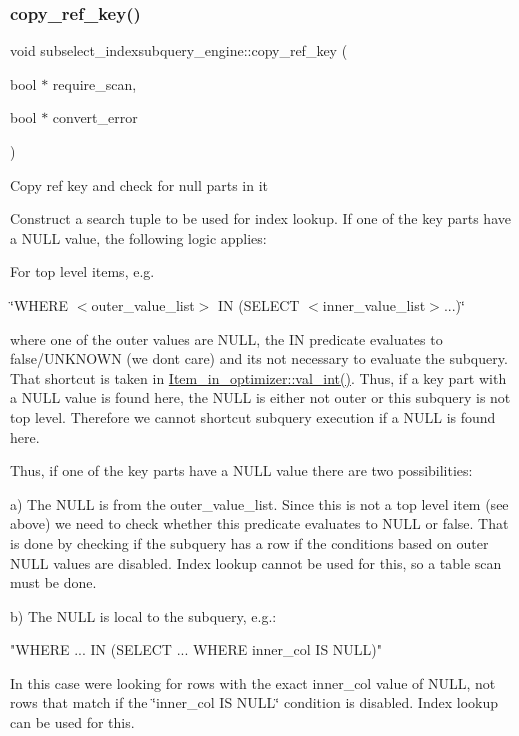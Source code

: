 \subsubsection{\texorpdfstring{copy\+\_\+ref\+\_\+key()}{copy\_ref\_key()}}
{\footnotesize\ttfamily void subselect\+\_\+indexsubquery\+\_\+engine\+::copy\+\_\+ref\+\_\+key (\begin{DoxyParamCaption}\item[{bool $\ast$}]{require\+\_\+scan,  }\item[{bool $\ast$}]{convert\+\_\+error }\end{DoxyParamCaption})}

Copy ref key and check for null parts in it

Construct a search tuple to be used for index lookup. If one of the key parts have a N\+U\+LL value, the following logic applies\+:

For top level items, e.\+g.

\char`\"{}\+W\+H\+E\+R\+E $<$outer\+\_\+value\+\_\+list$>$ I\+N (\+S\+E\+L\+E\+C\+T $<$inner\+\_\+value\+\_\+list$>$...)\char`\"{}

where one of the outer values are N\+U\+LL, the IN predicate evaluates to false/\+U\+N\+K\+N\+O\+WN (we don\textquotesingle{}t care) and it\textquotesingle{}s not necessary to evaluate the subquery. That shortcut is taken in \mbox{\hyperlink{classItem__in__optimizer_a24ae21b54394fd097a1b9ec9fd812bd9}{Item\+\_\+in\+\_\+optimizer\+::val\+\_\+int()}}. Thus, if a key part with a N\+U\+LL value is found here, the N\+U\+LL is either not outer or this subquery is not top level. Therefore we cannot shortcut subquery execution if a N\+U\+LL is found here.

Thus, if one of the key parts have a N\+U\+LL value there are two possibilities\+:

a) The N\+U\+LL is from the outer\+\_\+value\+\_\+list. Since this is not a top level item (see above) we need to check whether this predicate evaluates to N\+U\+LL or false. That is done by checking if the subquery has a row if the conditions based on outer N\+U\+LL values are disabled. Index lookup cannot be used for this, so a table scan must be done.

b) The N\+U\+LL is local to the subquery, e.\+g.\+: \begin{DoxyVerb}  "WHERE ... IN (SELECT ... WHERE inner_col IS NULL)"
\end{DoxyVerb}


In this case we\textquotesingle{}re looking for rows with the exact inner\+\_\+col value of N\+U\+LL, not rows that match if the \char`\"{}inner\+\_\+col I\+S N\+U\+L\+L\char`\"{} condition is disabled. Index lookup can be used for this.

